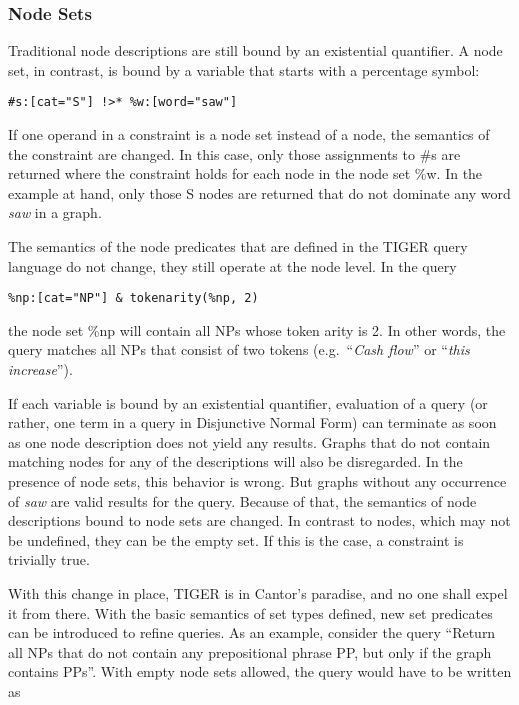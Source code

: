 \documentclass[output=paper]{LSP/langsci}
\begin{document}
\subsubsection{Node Sets}\label{sec:volk:3.2.3}

Traditional node descriptions are still bound by an existential quantifier. A node set, in contrast, is bound by a variable that starts with a percentage symbol:

\ea
\begin{lstlisting}
#s:[cat="S"] !>* %w:[word="saw"] 
\end{lstlisting}
\z

If one operand in a constraint is a node set instead of a node, the semantics of the constraint are changed. In this case, only those assignments to \#s are returned where the constraint holds for each node in the node set \%w. In the example at hand, only those S nodes are returned that do not dominate any word \textit{saw} in a graph. 

The semantics of the node predicates that are defined in the TIGER query language do not change, they still operate at the node level. In the query

\ea
\begin{lstlisting}
%np:[cat="NP"] & tokenarity(%np, 2)
\end{lstlisting}
\z

\noindent the node set \%np will contain all NPs whose token arity is 2. In other words, the query matches all NPs that consist of two tokens (e.g.~``\textit{Cash flow}'' or ``\textit{this increase}''). 

If each variable is bound by an existential quantifier, evaluation of a query (or rather, one term in a query in Disjunctive Normal Form) can terminate as soon as one node description does not yield any results. Graphs that do not contain matching nodes for any of the descriptions will also be disregarded. In the presence of node sets, this behavior is wrong. But graphs without any occurrence of \textit{saw} are valid results for the query. Because of that, the semantics of node descriptions bound to node sets are changed. In contrast to nodes, which may not be undefined, they can be the empty set. If this is the case, a constraint is trivially true. 

With this change in place, TIGER is in Cantor's paradise, and no one shall expel it from there. With the basic semantics of set types defined, new set predicates can be introduced to refine queries. As an example, consider the query ``Return all NPs that do not contain any prepositional phrase PP, but only if the graph contains PPs''. With empty node sets allowed, the query would have to be written as
\end{document}
